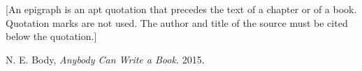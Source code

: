 \documentclass{ucalgarythesis}
\theoremstyle{plain}
\theoremstyle{definition}
\begin{document}
  [An epigraph is an apt quotation that precedes the text of a chapter or of a book. Quotation marks are not used. The author and title of the source must be cited below the quotation.]



  \mainmatter           %
    
  
    



  \thesisbibliography %


  \begin{thebibliography}{9}

     N. E. Body, {\em Anybody Can Write a Book.}  2015.
    
  \end{thebibliography}
   
 
%   

   
%  
%  
   


  \appendix

  


\end{document}
